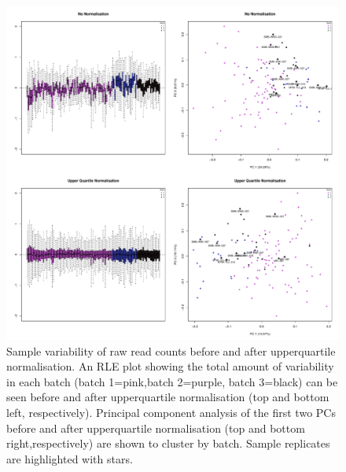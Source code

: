 \documentclass[12pt,a4paper,titlepage,twoside,openright]{book}
\begin{document}
\begin{mainmatter}
\begin{figure}[htb!]
\centering
\includegraphics[width=\textwidth,height=\textheight,keepaspectratio]{Normalisation_beforeandAfterUQnorm.pdf}
\caption{Sample variability of raw read counts before and after upperquartile normalisation. An RLE plot showing the total amount of variability in each batch (batch 1=pink,batch 2=purple, batch 3=black) can be seen before and after upperquartile normalisation (top and bottom left, respectively). Principal component analysis of the first two PCs before and after upperquartile normalisation (top and bottom right,respectively) are shown to cluster by batch. Sample replicates are highlighted with stars.}
\label{fig:UQ normalisation}
\end{figure}


\end{mainmatter}
\end{document}
